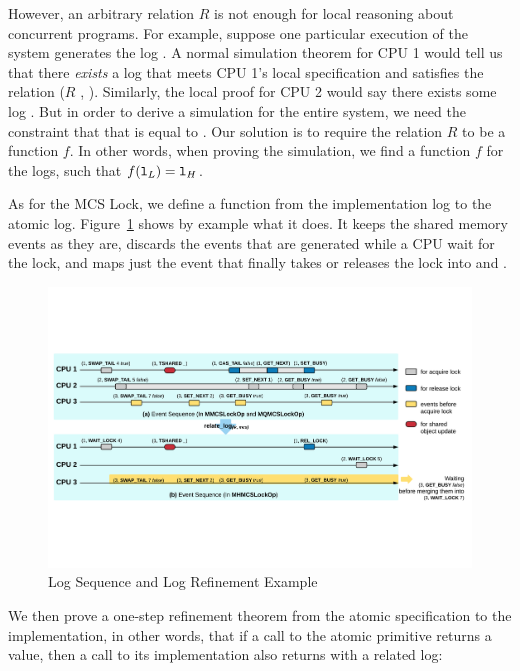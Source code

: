 However, an arbitrary relation $R$ is not enough for local reasoning
about concurrent programs.  For example, suppose one particular
execution of the system generates the log .  A normal simulation
theorem for CPU 1 would tell us that there \emph{exists} a log 
that meets CPU 1's local specification and satisfies the relation
($R$ , ). Similarly, the local proof for CPU 2 would say there
exists some log . But in order to derive a simulation for the
entire system, we need the constraint that that  is equal to
. Our solution is to require the relation $R$ to be a function $f$. 
In other words, when proving the simulation,
we find a function $f$ for the logs, such that $f({\mathrm{\texttt{l}}}_L) = {\mathrm{\texttt{l}}}_H$.


As for the MCS Lock, we define a function  from the
implementation log to the atomic log. Figure~\ref{fig:chapter:mcslock:logsequence}
shows by example what it does. It keeps the shared memory events as
they are, discards the events that are generated while a CPU wait for
the lock, and maps just the event that finally takes or releases the
lock into  and .
\begin{figure}
\includegraphics[width=\textwidth]{figs/mcslock/logsequence}
\caption{Log Sequence and Log Refinement Example}
\label{fig:chapter:mcslock:logsequence}
\end{figure}

We then prove a one-step refinement theorem from the atomic specification 
to the implementation, in other words, that if a call to the atomic primitive returns a 
value, then a call to its implementation also returns with a related log:

